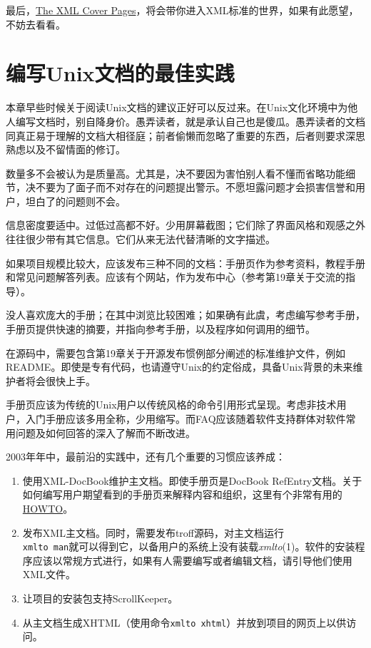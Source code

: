\documentclass[12pt,oneside]{book}
\begin{document}
最后，\href{http://xml.coverpages.org/}{The XML Cover Pages}，将会带你进入XML标准的世界，如果有此愿望，不妨去看看。

\section{编写Unix文档的最佳实践}
本章早些时候关于阅读Unix文档的建议正好可以反过来。在Unix文化环境中为他人编写文档时，别自降身价。愚弄读者，就是承认自己也是傻瓜。愚弄读者的文档同真正易于理解的文档大相径庭；前者偷懒而忽略了重要的东西，后者则要求深思熟虑以及不留情面的修订。

数量多不会被认为是质量高。尤其是，决不要因为害怕别人看不懂而省略功能细节，决不要为了面子而不对存在的问题提出警示。不愿坦露问题才会损害信誉和用户，坦白了的问题则不会。

信息密度要适中。过低过高都不好。少用屏幕截图；它们除了界面风格和观感之外往往很少带有其它信息。它们从来无法代替清晰的文字描述。

如果项目规模比较大，应该发布三种不同的文档：手册页作为参考资料，教程手册和常见问题解答列表。应该有个网站，作为发布中心（参考第19章关于交流的指导）。

没人喜欢庞大的手册；在其中浏览比较困难；如果确有此虞，考虑编写参考手册，手册页提供快速的摘要，并指向参考手册，以及程序如何调用的细节。

在源码中，需要包含第19章关于开源发布惯例部分阐述的标准维护文件，例如README。即使是专有代码，也请遵守Unix的约定俗成，具备Unix背景的未来维护者将会很快上手。

手册页应该为传统的Unix用户以传统风格的命令引用形式呈现。考虑非技术用户，入门手册应该多用全称，少用缩写。而FAQ应该随着软件支持群体对软件常用问题及如何回答的深入了解而不断改进。

2003年年中，最前沿的实践中，还有几个重要的习惯应该养成：
\begin{enumerate}
\item 使用XML-DocBook维护主文档。即使手册页是DocBook RefEntry文档。关于如何编写用户期望看到的手册页来解释内容和组织，这里有个非常有用的\href{http://www.tldp.org/HOWTO/mini/Man-Page.html}{HOWTO}。
\item 发布XML主文档。同时，需要发布troff源码，对主文档运行\\ \verb+xmlto man+就可以得到它，以备用户的系统上没有装载\textit{xmlto}(1)。软件的安装程序应该以常规方式进行，如果有人需要编写或者编辑文档，请引导他们使用XML文件。
\item 让项目的安装包支持ScrollKeeper。
\item 从主文档生成XHTML（使用命令\verb+xmlto xhtml+）并放到项目的网页上以供访问。
\end{enumerate}
\end{document}
